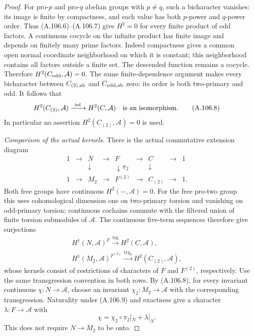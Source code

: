 \begin{proof}
For pro-\(p\) and pro-\(q\) abelian groups with \(p\ne q\), such a
bicharacter vanishes: its image is finite by compactness, and each
value has both \(p\)-power and \(q\)-power order. Thus (A.106.6)--(A.106.7)
give \(H^2=0\) for every finite product of odd factors.
A continuous cocycle on the infinite product has finite image and
depends on finitely many prime factors. Indeed compactness gives
a common open normal coordinate neighborhood on which it is constant;
this neighborhood contains all factors outside a finite set. The
descended function remains a cocycle. Therefore
\(H^2(C_{\rm odd},\mathcal A)=0\).
The same finite-dependence argument makes every bicharacter between
\(C_{(2),\rm ab}\) and \(C_{{\rm odd},\rm ab}\) zero: its order is
both two-primary and odd. It follows that
\[
 H^2(C_{(2)},\mathcal A)
       \xrightarrow{\ \mathrm{inf}\ }H^2(C,\mathcal A)
 \quad\hbox{is an isomorphism}.
 \tag{A.106.8}
\]
In particular no assertion \(H^2(C_{(2)},\mathcal A)=0\) is used.

\emph{Comparison of the actual kernels.}
There is the actual commutative extension diagram
\[
\begin{array}{ccccccccc}
1&\to&N&\to&F&\to&C&\to&1\\
 &&\downarrow&&\downarrow\pi_2&&\downarrow\\
1&\to&M_2&\to&F^{(2)}&\to&C_{(2)}&\to&1 .
\end{array}
 \tag{A.106.9}
\]
Both free groups have continuous \(H^2(-,\mathcal A)=0\).
For the free pro-two group this uses cohomological dimension one
on two-primary torsion and vanishing on odd-primary torsion;
continuous cochains commute with the filtered union of finite
torsion submodules of \(\mathcal A\).
The continuous five-term sequences therefore give surjections
\[
 \begin{gathered}
 H^1(N,\mathcal A)^F\xrightarrow{\operatorname{trg}}
                      H^2(C,\mathcal A),\\
 H^1(M_2,\mathcal A)^{F^{(2)}}
       \xrightarrow{\operatorname{trg}_2}H^2(C_{(2)},\mathcal A),
 \end{gathered}
\]
whose kernels consist of restrictions of characters of \(F\) and
\(F^{(2)}\), respectively. Use the same transgression convention
in both rows. By (A.106.8), for every invariant continuous
\(\chi:N\to\mathcal A\), choose an invariant
\(\chi_2:M_2\to\mathcal A\) with the corresponding transgression.
Naturality under (A.106.9) and exactness give a character
\(\lambda:F\to\mathcal A\) with
\[
 \chi=\chi_2\circ\pi_2|_N+\lambda|_N.
 \tag{A.106.10}
\]
This does not require \(N\to M_2\) to be onto.


\end{proof}
